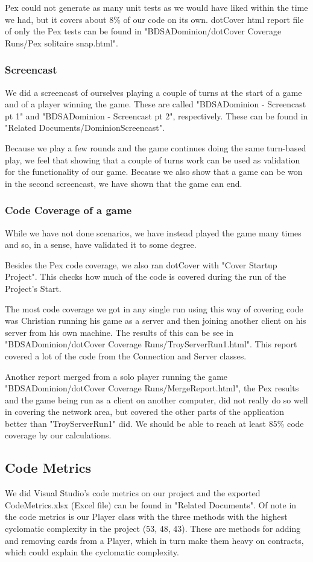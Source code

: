 \documentclass[12pt,a4paper,notitlepage]{article}
\begin{document}
Pex could not generate as many unit tests as we would have liked within the time we had, but it covers about 8\% of our code on its own. dotCover html report file of only the Pex tests can be found in "BDSADominion/dotCover Coverage Runs/Pex solitaire snap.html".

\subsubsection{Screencast}
We did a screencast of ourselves playing a couple of turns at the start of a game and of a player winning the game. These are called "BDSADominion - Screencast pt 1" and "BDSADominion - Screencast pt 2", respectively. These can be found in "Related Documents/DominionScreencast".

Because we play a few rounds and the game continues doing the same turn-based play, we feel that showing that a couple of turns work can be used as validation for the functionality of our game. Because we also show that a game can be won in the second screencast, we have shown that the game can end.

\subsubsection{Code Coverage of a game}
While we have not done scenarios, we have instead played the game many times and so, in a sense, have validated it to some degree.

Besides the Pex code coverage, we also ran dotCover with "Cover Startup Project". This checks how much of the code is covered during the run of the Project's Start. 

The most code coverage we got in any single run using this way of covering code was Christian running his game as a server and then joining another client on his server from his own machine. The results of this can be see in "BDSADominion/dotCover Coverage Runs/TroyServerRun1.html". This report covered a lot of the code from the Connection and Server classes. 

Another report merged from a solo player running the game "BDSADominion/dotCover Coverage Runs/Merge\textunderscore Report.html", the Pex results and the game being run as a client on another computer, did not really do so well in covering the network area, but covered the other parts of the application better than "TroyServerRun1" did. We should be able to reach at least 85\% code coverage by our calculations.

\subsection{Code Metrics}
We did Visual Studio's code metrics on our project and the exported CodeMetrics.xlsx (Excel file) can be found in "Related Documents".
Of note in the code metrics is our Player class with the three methods with the highest cyclomatic complexity in the project (53, 48, 43).  These are methods for adding and removing cards from a Player, which in turn make them heavy on contracts, which could explain the cyclomatic complexity.
\end{document}
